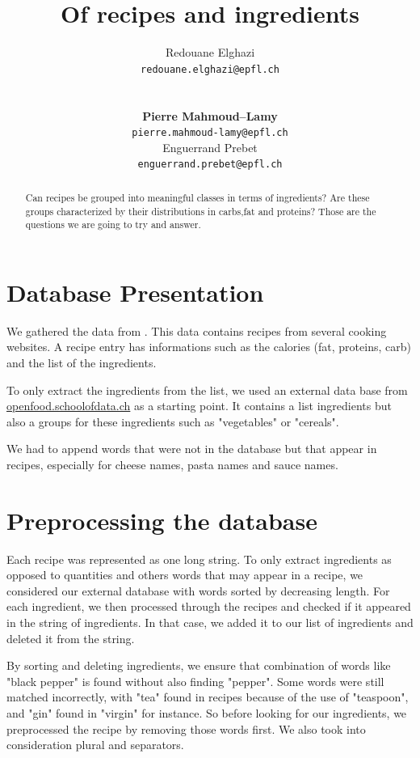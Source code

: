 \documentclass[11pt]{article}
\title{Of recipes and ingredients}
\author{Redouane Elghazi \\
  {\tt redouane.elghazi@epfl.ch} \\\And
  \\\\\textbf{Pierre Mahmoud--Lamy} \\
  {\tt pierre.mahmoud-lamy@epfl.ch} \\\And
Enguerrand Prebet \\
{\tt enguerrand.prebet@epfl.ch} \\}
\date{}
\begin{document}
\maketitle
\begin{abstract}
	
	Can recipes be grouped into meaningful classes in terms of ingredients? Are these groups characterized by their distributions in carbs,fat and proteins? Those are the questions we are going to try and answer.
\end{abstract}

\section{Database Presentation}
We gathered the data from . This data contains recipes from several cooking websites. A recipe entry has informations such as the calories (fat, proteins, carb) and the list of the ingredients. 

To only extract the ingredients from the list, we used an external data base from \href{http://openfood.schoolofdata.ch}{openfood.schoolofdata.ch} as a starting point. It contains a list ingredients but also a groups for these ingredients such as "vegetables" or "cereals".

We had to append words that were not in the database but that appear in recipes, especially for cheese names, pasta names and sauce names.

\section{Preprocessing the database}
Each recipe was represented as one long string. To only extract ingredients as opposed to quantities and others words that may appear in a recipe, we considered our external database with words sorted by decreasing length. For each ingredient, we then processed through the recipes and checked if it appeared in the string of ingredients. In that case, we added it to our list of ingredients and deleted it from the string.

By sorting and deleting ingredients, we ensure that combination of words like "black pepper" is found without also finding "pepper". Some words were still matched incorrectly, with "tea" found in recipes because of the use of "teaspoon", and "gin" found in "virgin" for instance. So before looking for our ingredients, we preprocessed the recipe by removing those words first.
We also took into consideration plural and separators.
\end{document}

